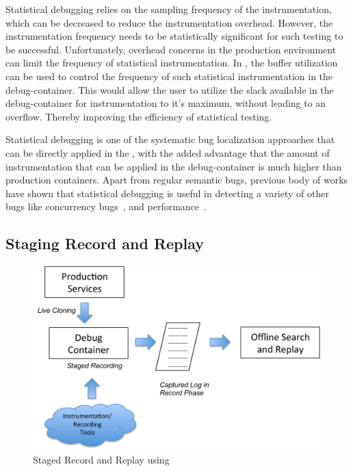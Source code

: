 Statistical debugging relies on the sampling frequency of the instrumentation, which can be decreased to reduce the instrumentation overhead.
However, the instrumentation frequency needs to be statistically significant for such testing to be successful. 
Unfortunately, overhead concerns in the production environment can limit the frequency of statistical instrumentation.
In \parikshan, the buffer utilization can be used to control the frequency of such statistical instrumentation in the debug-container. 
This would allow the user to utilize the slack available in the debug-container for instrumentation to it's maximum, without leading to an overflow. 
Thereby improving the efficiency of statistical testing.

Statistical debugging is one of the systematic bug localization approaches that can be directly applied in the \debugcontainer, with the added advantage that the amount of instrumentation that can be applied in the debug-container is much higher than production containers. 
Apart from regular semantic bugs, previous body of works have shown that statistical debugging is useful in detecting a variety of other bugs like concurrency bugs~\cite{statisticalConcurrency}, and performance~\cite{statisticalPerformance}.

\subsection{Staging Record and Replay}
\label{sec:activeStagedRecordReplay}

\begin{figure}[h!]
	
	\centering
	\includegraphics[width=0.99\textwidth]{guided/figs/stagedRecordReplay.pdf}
	\caption{Staged Record and Replay using \parikshan}
	\label{fig:stagedRecordReplay}
\end{figure}

